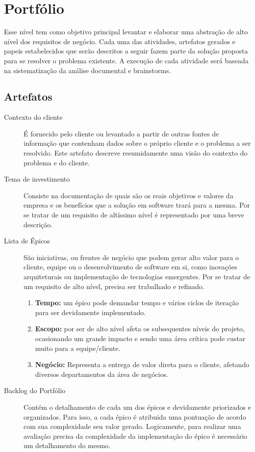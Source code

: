 \section{Portfólio}
Esse nível tem como objetivo principal levantar e elaborar uma abstração de alto nível dos requisitos de negócio. Cada uma das atividades, artefatos gerados e papeis estabelecidos que serão descritos a seguir fazem parte da solução proposta para se resolver o problema existente. A execução de cada atividade será baseada na sistematização da análise documental e brainstorms.

\subsection{Artefatos}
\begin{description}
\item[Contexto do cliente] É fornecido pelo cliente ou levantado a partir de outras fontes de informação que contenham dados sobre o próprio cliente e o problema a ser resolvido. Este artefato descreve resumidamente uma visão do contexto do problema e do cliente.
\item[Tema de investimento] Consiste na documentação de quais são os reais objetivos e valores da empresa e os benefícios que a solução em software trará para a mesma. Por se tratar de um requisito de altíssimo nível é representado por uma breve descrição.
\item[Lista de Épicos] São iniciativas, ou frentes de negócio que podem gerar alto valor para o cliente, equipe ou o desenvolvimento de software em si, como inovações arquiteturais ou implementação de tecnologias emergentes. Por se tratar de um requisito de alto nível, precisa ser trabalhado e refinado.
  \begin{enumerate}
    \item \textbf{Tempo:} um épico pode demandar tempo e vários ciclos de iteração para ser devidamente implementado.
    \item \textbf{Escopo:} por ser de alto nível afeta os subsequentes níveis do projeto, ocasionando um grande impacto e sendo uma área crítica pode custar muito para a equipe/cliente.
    \item \textbf{Negócio:} Representa a entrega de valor direta para o cliente, afetando diversos departamentos da área de negócios.
  \end{enumerate} 
\item[Backlog do Portfólio] Contém o detalhamento de cada um dos épicos e devidamente priorizados e organizados. Para isso, a cada épico é atribuida uma pontuação de acordo com sua complexidade seu valor gerado. Logicamente, para realizar uma avaliação precisa da complexidade da implementação do épico é necessário um detalhamento do mesmo.
\end{description}

